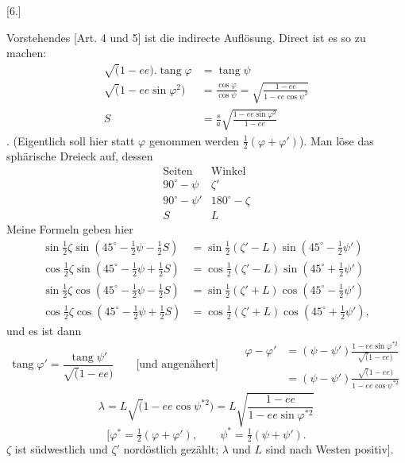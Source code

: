 \clearpage
\noindent\makebox[12mm][l]{}\par\medskip
\begin{center}[6.]\end{center}
Vorstehendes [Art. 4 und 5] ist die indirecte Auflösung. Direct ist es so
zu machen:
\[
\begin{aligned}
\surd(1-ee).\operatorname{tang}\varphi&=\operatorname{tang}\psi\\
\surd(1-ee\sin\varphi^2)&=\frac{\cos\varphi}{\cos\psi}
=\sqrt{\frac{1-ee}{1-ee\cos\psi^2}}\\
S&=\frac sa\sqrt{\frac{1-ee\sin\varphi^2}{1-ee}}
\end{aligned}
\]
.
(Eigentlich soll hier statt \(\varphi\) genommen werden \(\tfrac12(\varphi+\varphi')\)).
Man löse das sphärische Dreieck auf, dessen
\[
\begin{array}{c|c}
\text{Seiten}&\text{Winkel}\\\hline
90^\circ-\psi&\zeta'\\
90^\circ-\psi'&180^\circ-\zeta\\
S&L
\end{array}
\]
 Meine Formeln geben hier
\[
\begin{aligned}
\sin\tfrac12\zeta\sin(45^\circ-\tfrac12\psi-\tfrac12S)
&=\sin\tfrac12(\zeta'-L)\sin(45^\circ-\tfrac12\psi')\\
\cos\tfrac12\zeta\sin(45^\circ-\tfrac12\psi+\tfrac12S)
&=\cos\tfrac12(\zeta'-L)\sin(45^\circ+\tfrac12\psi')\\
\sin\tfrac12\zeta\cos(45^\circ-\tfrac12\psi-\tfrac12S)
&=\sin\tfrac12(\zeta'+L)\cos(45^\circ-\tfrac12\psi')\\
\cos\tfrac12\zeta\cos(45^\circ-\tfrac12\psi+\tfrac12S)
&=\cos\tfrac12(\zeta'+L)\cos(45^\circ+\tfrac12\psi'),
\end{aligned}
\]
\noindent und es ist dann
\[
\operatorname{tang}\varphi'=\frac{\operatorname{tang}\psi'}{\surd(1-ee)}
\qquad\text{[und angenähert]}\qquad
\begin{aligned}
\varphi-\varphi'&=(\psi-\psi')\frac{1-ee\sin\varphi^{*2}}{\surd(1-ee)}\\
&=(\psi-\psi')\frac{\surd(1-ee)}{1-ee\cos\psi^{*2}}
\end{aligned}
\]
\[
\lambda=L\surd(1-ee\cos\psi^{*2})
=L\sqrt{\frac{1-ee}{1-ee\sin\varphi^{*2}}}
\]
\[
[\varphi^*=\tfrac12(\varphi+\varphi'),\qquad
\psi^*=\tfrac12(\psi+\psi').
\]
\noindent\(\zeta\) ist südwestlich und \(\zeta'\) nordöstlich gezählt; \(\lambda\) und \(L\) sind nach Westen positiv].


